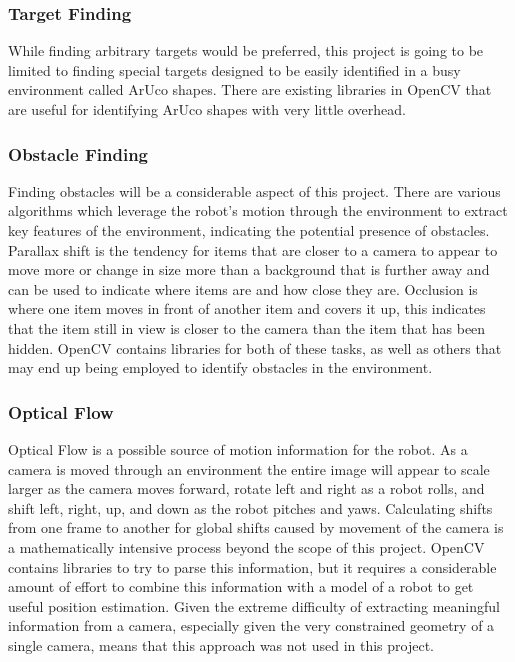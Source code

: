 \documentclass{article}[12]
\begin{document}
		\subsubsection{Target Finding}
		
		While finding arbitrary targets would be preferred, this project is going to be limited to finding special targets designed to be easily identified in a busy environment called ArUco shapes. There are existing libraries in OpenCV that are useful for identifying ArUco shapes with very little overhead. 
		
		\subsubsection{Obstacle Finding}
		
		Finding obstacles will be a considerable aspect of this project. There are various algorithms which leverage the robot's motion through the environment to extract key features of the environment, indicating the potential presence of obstacles. Parallax shift is the tendency for items that are closer to a camera to appear to move more or change in size more than a background that is further away and can be used to indicate where items are and how close they are. Occlusion is where one item moves in front of another item and covers it up, this indicates that the item still in view is closer to the camera than the item that has been hidden. OpenCV contains libraries for both of these tasks, as well as others that may end up being employed to identify obstacles in the environment.
		
		\subsubsection{Optical Flow}
		
		Optical Flow is a possible source of motion information for the robot. As a camera is moved through an environment the entire image will appear to scale larger as the camera moves forward, rotate left and right as a robot rolls, and shift left, right, up, and down as the robot pitches and yaws. Calculating shifts from one frame to another for global shifts caused by movement of the camera is a mathematically intensive process beyond the scope of this project. OpenCV contains libraries to try to parse this information, but it requires a considerable amount of effort to combine this information with a model of a robot to get useful position estimation. Given the extreme difficulty of extracting meaningful information from a camera, especially given the very constrained geometry of a single camera, means that this approach was not used in this project.
		
\end{document}
